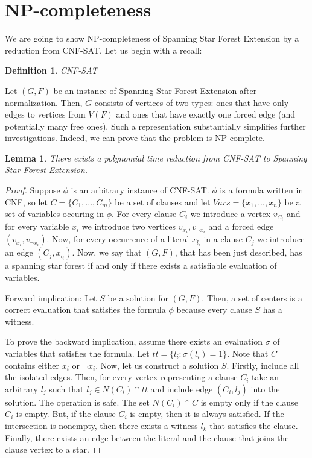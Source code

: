 \documentclass[en]{pracamgr}
\newtheorem{definition}{Definition}
\newtheorem{lemma}{Lemma}
\newcommand{\ssfep}{{\sc Spanning Star Forest Extension}}
\newcommand{\cnfsat}{{\sc CNF-SAT}}
\begin{document}
\section{NP-completeness}

We are going to show NP-completeness of \ssfep{} by a reduction from \cnfsat{}. Let us begin with a recall:

\begin{definition}
	CNF-SAT
\end{definition}

Let $(G,F)$ be an instance of \ssfep{} after normalization. Then, $G$ consists of vertices of two types: ones that have only edges to vertices from $V(F)$ and ones that have exactly one forced edge (and potentially many free ones). Such a representation substantially simplifies further investigations. Indeed, we can prove that the problem is NP-complete.

\begin{lemma}\label{ssfep reduction}
	There exists a polynomial time reduction from \cnfsat{} to \ssfep{}.
\end{lemma}

\begin{proof}
	Suppose $\phi$ is an arbitrary instance of \cnfsat{}. $\phi$ is a formula written in CNF, so let $C=\{C_1,...,C_m\}$ be a set of clauses and let $Vars=\{x_1,...,x_n\}$ be a set of variables occuring in $\phi$. For every clause $C_i$ we introduce a vertex $v_{C_i}$ and for every variable $x_i$ we introduce two vertices $v_{x_i},v_{\neg x_i}$ and a forced edge $(v_{x_i}, v_{\neg x_i})$. Now, for every occurrence of a literal $x_{l_i}$ in a clause $C_j$ we introduce an edge $(C_j, x_{l_i})$. Now, we say that $(G,F)$, that has been just described, has a spanning star forest if and only if there exists a satisfiable evaluation of variables.
	
	Forward implication: Let $S$ be a solution for $(G,F)$. Then, a set of centers is a correct evaluation that satisfies the formula $\phi$ because every clause $S$ has a witness.
	
	To prove the backward implication, assume there exists an evaluation $\sigma$ of variables that satisfies the formula. Let $tt = \{l_i: \sigma(l_i) = 1\} $. Note that $C$ contains either $x_i$ or $\neg x_i$. Now, let us construct a solution $S$. Firstly, include all the isolated edges. Then, for every vertex representing a clause $C_i$ take an arbitrary $l_j$ such that $l_j \in N(C_i) \cap tt$ and include edge $(C_i, l_j)$ into the solution. The operation is safe. The set $ N(C_i) \cap C$ is empty only if the clause $C_i$ is empty. But, if the clause $C_i$ is empty, then it is always satisfied. If the intersection is nonempty, then there exists a witness $l_k$ that satisfies the clause. Finally, there exists an edge between the literal and the clause that joins the clause vertex to a star.
	
\end{proof}
\end{document}
